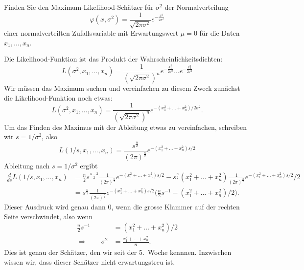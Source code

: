 Finden Sie den Maximum-Likelihood-Schätzer für $\sigma^2$ der Normalverteilung
\[
\varphi(x,\sigma^2)
= 
\frac1{\sqrt{2\pi \sigma^2}} e^{-\frac{x^2}{2\sigma^2}}
\]
einer normalverteilten Zufallsvariable mit Erwartungswert $\mu=0$ für die
Daten $x_1,\dots,x_n$.


\begin{loesung}
Die Likelihood-Funktion ist das Produkt der Wahrscheinlichkeitsdichten:
\[
L(\sigma^2,x_1,\dots,x_n)
=
\frac1{(\sqrt{2\pi \sigma^2})^n}
e^{-\frac{x_1^2}{2\sigma^2}}
\dots
e^{-\frac{x_n^2}{2\sigma^2}}
\]
Wir müssen das Maximum suchen und vereinfachen zu diesem Zweck zunächst
die Likelihood-Funktion noch etwas:
\[
L(\sigma^2,x_1,\dots,x_n)
=
\frac1{(\sqrt{2\pi \sigma^2})^n}
e^{-(x_1^2+\dots+x_n^2)/2\sigma^2}.
\]
Um das Finden des Maximus mit der Ableitung etwas zu vereinfachen,
schreiben wir $s=1/\sigma^2$, also
\[
L(1/s,x_1,\dots,x_n)
=
\frac{s^{\frac{n}2}}{(2\pi)^{\frac{n}2}}
e^{-(x_1^2+\dots+x_n^2)s/2}
\]
Ableitung nach $s=1/\sigma^2$ ergibt
\begin{align*}
\frac{d}{ds}
L(1/s,x_1,\dots,x_n)
&=
\frac{n}2s^{\frac{n-2}2}
\frac1{(2\pi)^{\frac{n}2}}
e^{-(x_1^2+\dots+x_n^2)s/2}
-
s^{\frac{n}2}
(x_1^2+\dots+x_n^2)
\frac1{(2\pi)^{\frac{n}2}}
e^{-(x_1^2+\dots+x_n^2)s/2}/2
\\
&=
s^{\frac{n}2}
\frac1{(2\pi)^{\frac{n}2}}
e^{-(x_1^2+\dots+x_n^2)s/2}
\biggl(
\frac{n}2
s^{-1}
-
(x_1^2+\dots+x_n^2)/2
\biggr).
\end{align*}
Dieser Ausdruck wird genau dann $0$, wenn die grosse Klammer auf der
rechten Seite verschwindet, also wenn
\begin{align*}
\frac{n}2
s^{-1}
&=
(x_1^2+\dots+x_n^2)/2
\\
\Rightarrow\qquad
\sigma^2
&=
\frac{x_1^2+\dots+x_n^2}n.
\end{align*}
Dies ist genau der Schätzer, den wir seit der 5.~Woche kennnen.
Inzwischen wissen wir, dass dieser Schätzer nicht erwartungstreu ist.
\end{loesung}



